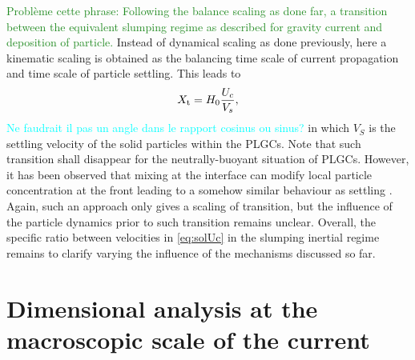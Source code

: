 \documentclass[twocolumn]{article}
\newcommand*{\cyril}{\textcolor{ForestGreen}}
\newcommand*{\marie}{\textcolor{Cyan}}
\begin{document}
\cyril{Problème cette phrase: Following the balance scaling as done far, a transition between the equivalent slumping regime as described for gravity current and deposition of particle.} Instead of dynamical scaling as done previously, here a kinematic scaling is obtained as the balancing time scale of current propagation and time scale of particle settling. This leads to
\begin{equation}
	\label{eq:Xt_settling}
	X_{\rm t}=H_0\frac{U_c}{V_s},
\end{equation}
\marie{Ne faudrait il pas un angle dans le rapport cosinus ou sinus?}
in which $V_S$ is the settling velocity of the solid particles within the PLGCs. Note that such transition shall disappear for the neutrally-buoyant situation of PLGCs. However, it has been observed that mixing at the interface can modify local particle concentration at the front leading to a somehow similar behaviour as settling \cite{Schneider???}.
Again, such an approach only gives a scaling of transition, but the influence of the particle dynamics prior to such transition remains unclear.
Overall, the specific ratio between velocities in \eqref{eq:solUc} in the slumping inertial regime remains to clarify varying the influence of the mechanisms discussed so far.

\section{Dimensional analysis at the macroscopic scale of the current}
\label{sec:dimensionlessmap}
\end{document}

